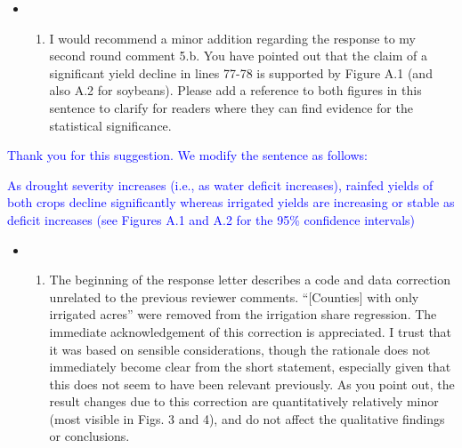 \documentclass[
]{article}
\providecommand{\tightlist}{%
  \setlength{\itemsep}{0pt}\setlength{\parskip}{0pt}}
\begin{document}
\begin{itemize}
\item
  \begin{enumerate}
  \def\labelenumi{(\arabic{enumi})}
  \tightlist
  \item
    I would recommend a minor addition regarding the response to my
    second round comment 5.b. You have pointed out that the claim of a
    significant yield decline in lines 77-78 is supported by Figure A.1
    (and also A.2 for soybeans). Please add a reference to both figures
    in this sentence to clarify for readers where they can find evidence
    for the statistical significance.
  \end{enumerate}
\end{itemize}

\textcolor{blue}{Thank you for this suggestion. We modify the sentence as follows:}

\textcolor{blue}{As drought severity increases (i.e., as water deficit increases), rainfed yields of both crops decline significantly whereas irrigated yields are increasing or stable as deficit increases (see Figures A.1 and A.2 for the 95\% confidence intervals)}

\begin{itemize}
\item
  \begin{enumerate}
  \def\labelenumi{(\arabic{enumi})}
  \setcounter{enumi}{1}
  \tightlist
  \item
    The beginning of the response letter describes a code and data
    correction unrelated to the previous reviewer comments.
    ``{[}Counties{]} with only irrigated acres'' were removed from the
    irrigation share regression. The immediate acknowledgement of this
    correction is appreciated. I trust that it was based on sensible
    considerations, though the rationale does not immediately become
    clear from the short statement, especially given that this does not
    seem to have been relevant previously. As you point out, the result
    changes due to this correction are quantitatively relatively minor
    (most visible in Figs. 3 and 4), and do not affect the qualitative
    findings or conclusions.
  \end{enumerate}
\end{itemize}
\end{document}
